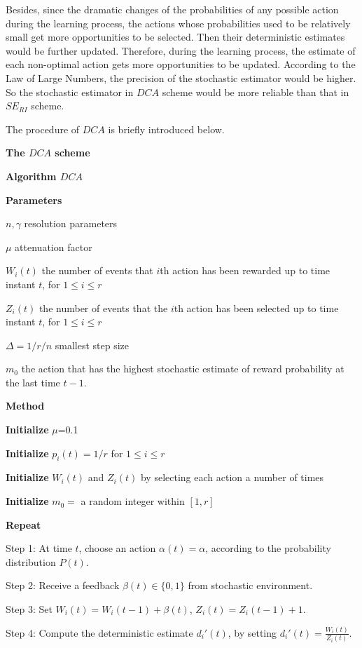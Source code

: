 Besides, since the dramatic changes of the probabilities of any possible action during the learning process, the actions whose probabilities used to be relatively small get more opportunities to be selected. Then their deterministic estimates would be further updated. Therefore, during the learning process, the estimate of each non-optimal action gets more opportunities to be updated. According to the Law of Large Numbers, the precision of the stochastic estimator would be higher. So the stochastic estimator in $DCA$ scheme would be more reliable than that in $SE_{RI}$ scheme.

The procedure of $DCA$ is briefly introduced below.

\textbf{The $DCA$ scheme}

\textbf{Algorithm $DCA$}

\textbf{Parameters}

$n,\gamma$ resolution parameters

$\mu $ attenuation factor

${W_i}(t)$ the number of events that $i$th action has been rewarded up to time instant $t$, for $1 \le i \le r$

${Z_i}(t)$ the number of events that the $i$th action has been selected up to time instant $t$, for $1 \le i \le r$

$\Delta = 1/r/n$ smallest step size

${m_0}$ the action that has the highest stochastic estimate of reward probability at the last time $t-1$.

\textbf{Method}

\textbf{Initialize} $\mu $=0.1

\textbf{Initialize} ${p_i}(t) = 1/r$ for $1 \le i \le r$

\textbf{Initialize} ${W_i}(t)$ and ${Z_i}(t)$ by selecting each action a number of times

\textbf{Initialize} ${m_0} = $ a random integer within $[1,r]$

\textbf{Repeat}

Step 1: At time $t$, choose an action $\alpha (t) = \alpha $, according to the probability distribution $P(t)$.

Step 2: Receive a feedback $\beta (t) \in \{ 0,1\} $ from stochastic environment.

Step 3: Set $W{}_i(t) = {W_i}(t - 1) + \beta (t)$, ${Z_i}(t) = {Z_i}(t - 1) + 1$.

Step 4: Compute the deterministic estimate $d_i'(t)$, by setting $d_i'(t) = \frac{{{W_i}(t)}}{{{Z_i}(t)}}$.


